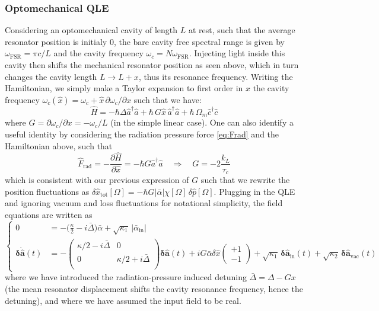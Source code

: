 \subsubsection{Optomechanical QLE}
Considering an optomechanical cavity of length $L$ at rest, such that the average resonator position is initialy 0, the bare cavity free spectral range is given by $\omega_{\mathrm{FSR}}=\pi c /L$ and the cavity frequency $\omega_c = N \omega_{\mathrm{FSR}}$. Injecting light inside this cavity then shifts the mechanical resonator position as seen above, which in turn changes the cavity length $L \rightarrow L+x$, thus its resonance frequency. Writing the Hamiltonian, we simply make a Taylor expansion to first order in $\hat{x}$ the cavity frequency $\omega_c(\hat{x})=\omega_c + \hat x \, \partial \omega_c / \partial x$ such that we have: 
\begin{equation}
\hat{H} = - \hbar \Delta  \hat{a}^\dagger \hat{a} + \hbar \, G  \hat{x} \, \hat{a}^{\dagger} \hat{a} + \hbar \, \Omega_m \hat{c}^\dagger \hat{c}
\end{equation}
where $G=  \partial \omega_c / \partial x = - \omega_c/L$ (in the simple linear case). One can also identify a useful identity by considering the radiation pressure force \eqref{eq:Frad} and the Hamiltonian above, such that
\begin{equation}
  \hat F_{\textrm{rad}} = - \frac{\partial \hat H}{\partial \hat x} = - \hbar G \hat{a}^\dagger \hat{a} \quad \Rightarrow \quad G = - 2 \frac{k_L}{\tau_c}
\end{equation}
which is consistent with our previous expression of $G$ such that we rewrite the position fluctuations as $\delta \hat x_{\mathrm{tot}} [\Omega]= - \hbar G |\bar \alpha| \chi[\Omega]\, \delta\hat p[\Omega]$. 
Plugging in the QLE and ignoring vacuum and loss fluctuations for notational simplicity, the field equations are written as 
\begin{equation}
  \left\{
  \begin{split}
  0 &= -\Big(\frac{\kappa}{2}-i\bar\Delta\Big) \bar{\alpha} + \sqrt{\kappa_1} \, |\bar{\alpha}_{\mathrm{in}}| \\
  \mathbf{\delta \dot{\hat{a}}}(t)&= - \begin{pmatrix}
  \kappa/2-i\bar\Delta & 0 \\ 
   0 &\kappa/2+i\bar\Delta \\ 
  \end{pmatrix}  \mathbf{\delta \hat{a}}(t) + iG\bar{\alpha}\delta \hat{x} \begin{pmatrix} +1 \\ -1\end{pmatrix}  +  \sqrt{\kappa_{\mathrm{1}}} \, \mathbf{\delta \hat{a}_{\mathrm{in}}}(t)  + \sqrt{\kappa_2} \, \mathbf{\delta \hat{a}_{\mathrm{vac}}}(t) 
  \end{split}
  \right.
\end{equation}
where we have introduced the radiation-pressure induced detuning $\bar\Delta = \Delta - G x$ (the mean resonator displacement shifts the cavity resonance frequency, hence the detuning), and where we have assumed the input field to be real. \\ 

